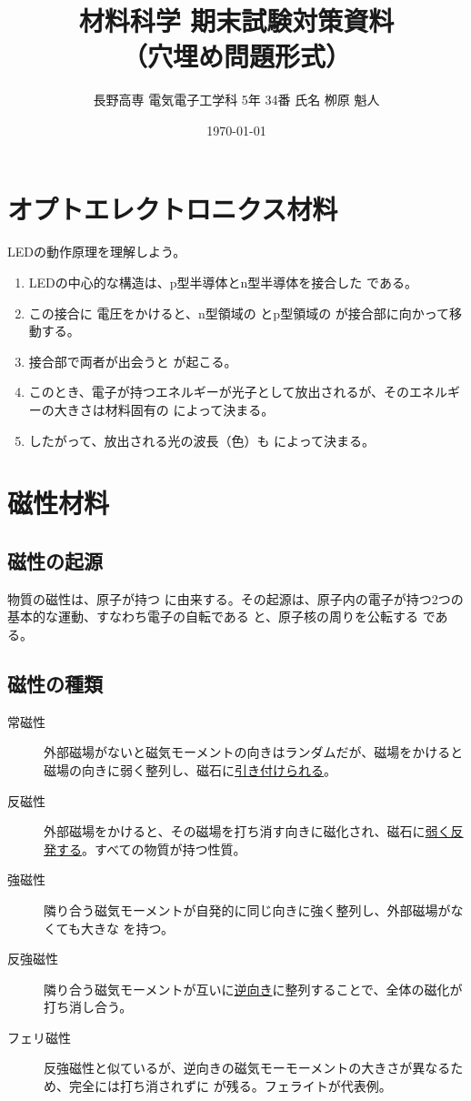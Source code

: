 \documentclass[11pt,a4paper]{ltjsarticle}
\title{材料科学 期末試験対策資料\\（穴埋め問題形式）}
\author{長野高専 電気電子工学科 5年 34番 氏名 栁原 魁人}
\date{\today}
\newcommand{\blank}{\underline{\hspace{3cm}}}
\begin{document}
\maketitle
\thispagestyle{fancy}

\tableofcontents
\clearpage

\section{オプトエレクトロニクス材料}
LEDの動作原理を理解しよう。

\begin{enumerate}
    \item LEDの中心的な構造は、p型半導体とn型半導体を接合した \blank である。
    \item この接合に \blank 電圧をかけると、n型領域の \blank とp型領域の \blank が接合部に向かって移動する。
    \item 接合部で両者が出会うと \blank が起こる。
    \item このとき、電子が持つエネルギーが光子として放出されるが、そのエネルギーの大きさは材料固有の \blank によって決まる。
    \item したがって、放出される光の波長（色）も \blank によって決まる。
\end{enumerate}

\section{磁性材料}

\subsection{磁性の起源}
物質の磁性は、原子が持つ \blank に由来する。その起源は、原子内の電子が持つ2つの基本的な運動、すなわち電子の自転である \blank と、原子核の周りを公転する \blank である。

\subsection{磁性の種類}
\begin{description}
    \item[常磁性] 外部磁場がないと磁気モーメントの向きはランダムだが、磁場をかけると磁場の向きに弱く整列し、磁石に\underline{引き付けられる}。
    \item[反磁性] 外部磁場をかけると、その磁場を打ち消す向きに磁化され、磁石に\underline{弱く反発する}。すべての物質が持つ性質。
    \item[強磁性] 隣り合う磁気モーメントが自発的に同じ向きに強く整列し、外部磁場がなくても大きな \blank を持つ。
    \item[反強磁性] 隣り合う磁気モーメントが互いに\underline{逆向き}に整列することで、全体の磁化が打ち消し合う。
    \item[フェリ磁性] 反強磁性と似ているが、逆向きの磁気モーモーメントの大きさが異なるため、完全には打ち消されずに \blank が残る。フェライトが代表例。
\end{description}
\end{document}

